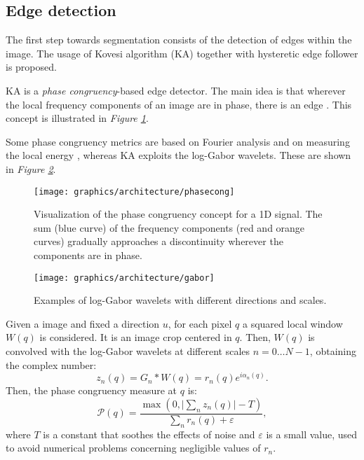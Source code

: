     \subsection{Edge detection}\label{subsection:contour_detection}
        \par{
            The first step towards segmentation consists of the detection of edges within the image. The usage of Kovesi algorithm (KA) \cite{mit:kovesiphase, googlescholar:kovesiphase} together with hysteretic edge follower \cite{Klette:2014:CCV:2584519} is proposed.
        }
        \par{
            KA is a \emph{phase congruency}-based edge detector. The main idea is that wherever the local frequency components of an image are in phase, there is an edge \cite{researchgate:morrone}. This concept is illustrated in \emph{Figure \ref{fig:phase-congruency}}.
        }
        \par{
            Some phase congruency metrics are based on Fourier analysis and on measuring the local energy \cite{researchgate:phase}, whereas KA exploits the log-Gabor wavelets. These are shown in \emph{Figure \ref{fig:gabor}}.
        }
    	\begin{figure}
    		\centering
    		\texttt{[image: graphics/architecture/phasecong]}
    		\caption{Visualization of the phase congruency concept for a 1D signal. The sum (blue curve) of the frequency components (red and orange curves) gradually approaches a discontinuity wherever the components are in phase.}
    		\label{fig:phase-congruency}
    	\end{figure}
    	\begin{figure}
    		\centering
    		\texttt{[image: graphics/architecture/gabor]}
    		\caption{Examples of log-Gabor wavelets with different directions and scales.}
    		\label{fig:gabor}
    	\end{figure}
		\par{
			Given a image and fixed a direction $u$, for each pixel $q$ a squared local window $W(q)$ is considered. It is an image crop centered in $q$. Then, $W(q)$ is convolved with the log-Gabor wavelets at different scales $n = 0 \dots N-1$, obtaining the complex number:
	    	\begin{equation*}
	    		z_{n} (q) = G_{n} * W(q) = r_{n} (q) e^{i \alpha_{n} (q)}.
	    	\end{equation*}
	    	Then, the phase congruency measure at $q$ is:
            \begin{equation*}
	            \mathcal{P} (q) = \frac{\max(0,\lvert \sum_{n} z_{n} (q) \rvert - T)}{\sum_{n} r_{n} (q) + \varepsilon},
            \end{equation*}
            where $T$ is a constant that soothes the effects of noise and $\varepsilon$ is a small value, used to avoid numerical problems concerning negligible values of $r_n$. 
        }
